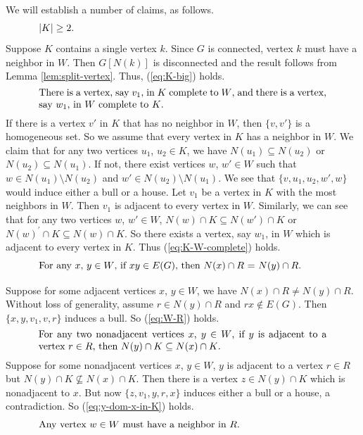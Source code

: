 \documentclass[a4paper,11pt]{article}
\theoremstyle{case}
\begin{document}
We will establish a number of claims, as follows.
\begin{equation}\label{eq:K-big}
	\text{\parbox{.85\textwidth}{
    $|K| \ge 2$.
    }}
\end{equation}
Suppose $K$ contains a single vertex $k$. Since $G$ is connected, vertex $k$ must have a neighbor in $W$. Then $G[N(k)]$ is disconnected and the result follows from Lemma \ref{lem:split-vertex}. Thus, (\ref{eq:K-big}) holds.
%
\begin{equation}\label{eq:K-W-complete}
	\text{\parbox{.85\textwidth}{
     There is a vertex, say $v_1$, in $K$ complete to $W$, and there is a vertex, say $w_1$, in $W$ complete to $K$.
    }}
\end{equation}
If there is a vertex $v'$ in $K$ that has no neighbor in $W$, then $\{v, v'\}$ is a homogeneous set. So we assume that every vertex in $K$ has a neighbor in $W$. We claim that for any two vertices $u_1$, $u_2\in K$, we have $N(u_1)\subseteq N(u_2)$ or $N(u_2)\subseteq N(u_1)$. If not, there exist vertices $w$, $w' \in W$ such that $w\in N(u_1)\setminus N(u_2)$ and $w'\in N(u_2)\setminus N(u_1)$. We see that $\{v, u_1, u_2, w', w\}$ would induce either a bull or a house. Let $v_1$ be a vertex in $K$ with the most neighbors in $W$. Then $v_1$ is adjacent to every vertex in $W$. Similarly, we can see that for any two vertices $w$, $w' \in W$, $N(w)\cap K \subseteq N(w')\cap K$ or $N(w)^{'}\cap K \subseteq N(w)\cap K$. So there exists a vertex, say $w_{1}$, in $W$ which is adjacent to every vertex in $K$. Thus (\ref{eq:K-W-complete}) holds. 
%
\begin{equation}\label{eq:W-R}
	\text{\parbox{.85\textwidth}{
     For any $x$, $y \in W$, if $xy\in E(G)$, then $N(x)\cap R$ = $N(y)\cap R$.
    }}
\end{equation}

Suppose for some adjacent vertices $x$, $y\in W$, we have $N(x)\cap R \neq N(y)\cap R$. Without loss of generality, assume $r\in N(y)\cap R$ and $rx \notin E(G)$. Then $\{x, y,  v_1, v , r\}$ induces a bull. So (\ref{eq:W-R}) holds. 
%
%
\begin{equation}\label{eq:y-dom-x-in-K}
	\text{\parbox{.85\textwidth}{
     For any two nonadjacent vertices $x$, $y \in W$, if $y$ is adjacent to a vertex $r \in R$, then $N(y) \cap K \subseteq N(x) \cap K$.
    }}
\end{equation}
Suppose for some nonadjacent vertices $x$, $y \in W$, $y$ is adjacent to a vertex $r \in R$ but $N(y) \cap K \nsubseteq N(x) \cap K$. Then there is a vertex $z\in N(y)\cap K$ which is nonadjacent to $x$. But now $\{ z, v_1, y, r,  x\}$ induces either a bull or a house, a contradiction. So (\ref{eq:y-dom-x-in-K}) holds.
%
\begin{equation}\label{eq:W-neighbors-in-R}
	\text{\parbox{.85\textwidth}{
     Any vertex $w\in W$ must have a neighbor in $R$.
    }}
\end{equation}
\end{document}
